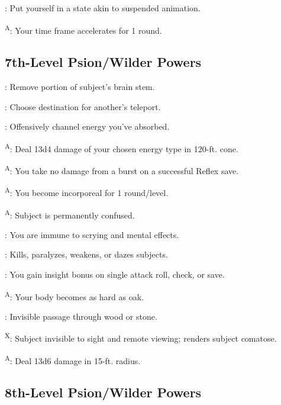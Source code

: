 : Put yourself in a state akin to suspended animation.

\textsuperscript{A}: Your time frame accelerates for 1 round.




\subsection{7th-Level Psion/Wilder Powers}

: Remove portion of subject's brain stem.

: Choose destination for another's teleport.

: Offensively channel energy you've absorbed.

\textsuperscript{A}: Deal 13d4 damage of your chosen energy type in 120-ft. cone.

\textsuperscript{A}: You take no damage from a burst on a successful Reflex save.

\textsuperscript{A}: You become incorporeal for 1 round/level.

\textsuperscript{A}: Subject is permanently confused.

: You are immune to scrying and mental effects.

: Kills, paralyzes, weakens, or dazes subjects.

: You gain insight bonus on single attack roll, check, or save.

\textsuperscript{A}: Your body becomes as hard as oak.

: Invisible passage through wood or stone.

\textsuperscript{X}: Subject invisible to sight and remote viewing; renders subject comatose.

\textsuperscript{A}: Deal 13d6 damage in 15-ft. radius.




\subsection{8th-Level Psion/Wilder Powers}

